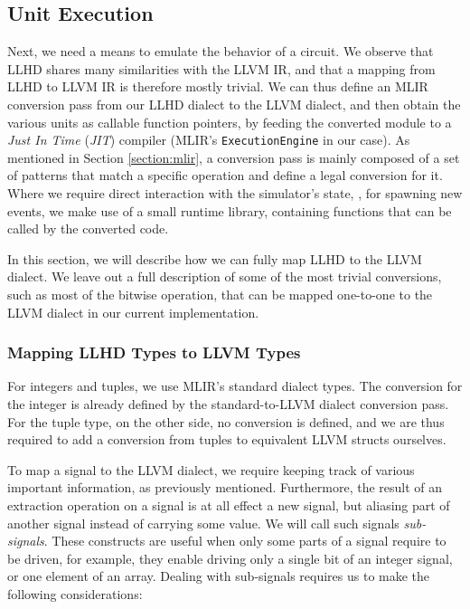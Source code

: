 \subsection{Unit Execution}
\label{sec:execution}
Next, we need a means to emulate the behavior of a circuit. We observe that LLHD shares many similarities with the LLVM IR, and that a mapping from LLHD to LLVM IR is therefore mostly trivial. We can thus define an MLIR conversion pass from our LLHD dialect to the LLVM dialect, and then obtain the various units as callable function pointers, by feeding the converted module to a \textit{Just In Time} (\textit{JIT}) compiler (MLIR's \texttt{ExecutionEngine} in our case). As mentioned in Section \ref{section:mlir}, a conversion pass is mainly composed of a set of patterns that match a specific operation and define a legal conversion for it. Where we require direct interaction with the simulator's state, \eg, for spawning new events, we make use of a small runtime library, containing functions that can be called by the converted code.

In this section, we will describe how we can fully map LLHD to the LLVM dialect. We leave out a full description of some of the most trivial conversions, such as most of the bitwise operation, that can be mapped one-to-one to the LLVM dialect in our current implementation.


\subsubsection{Mapping LLHD Types to LLVM Types}
\label{sec:typeconv}
For integers and tuples, we use MLIR's standard dialect types. The conversion for the integer is already defined by the standard-to-LLVM dialect conversion pass. For the tuple type, on the other side, no conversion is defined, and we are thus required to add a conversion from tuples to equivalent LLVM structs ourselves.

To map a signal to the LLVM dialect, we require keeping track of various important information, as previously mentioned. Furthermore, the result of an extraction operation on a signal is at all effect a new signal, but aliasing part of another signal instead of carrying some value. We will call such signals \textit{sub-signals}. These constructs are useful when only some parts of a signal require to be driven, for example, they enable driving only a single bit of an integer signal, or one element of an array.
Dealing with sub-signals requires us to make the following considerations:

